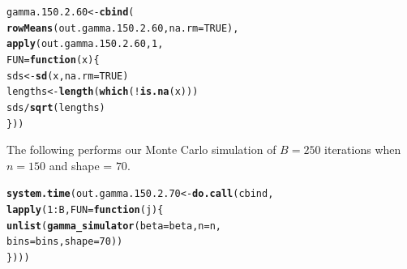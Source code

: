 \documentclass[11pt]{article}\usepackage[]{graphicx}\usepackage[]{color}
\makeatletter
\newcommand{\hlnum}[1]{\textcolor[rgb]{0.686,0.059,0.569}{#1}}%
\newcommand{\hlopt}[1]{\textcolor[rgb]{0,0,0}{#1}}%
\newcommand{\hlstd}[1]{\textcolor[rgb]{0.345,0.345,0.345}{#1}}%
\newcommand{\hlkwa}[1]{\textcolor[rgb]{0.161,0.373,0.58}{\textbf{#1}}}%
\newcommand{\hlkwb}[1]{\textcolor[rgb]{0.69,0.353,0.396}{#1}}%
\newcommand{\hlkwc}[1]{\textcolor[rgb]{0.333,0.667,0.333}{#1}}%
\newcommand{\hlkwd}[1]{\textcolor[rgb]{0.737,0.353,0.396}{\textbf{#1}}}%
\newenvironment{kframe}{%
 \def\at@end@of@kframe{}%
 \ifinner\ifhmode%
  \def\at@end@of@kframe{\end{minipage}}%
  \begin{minipage}{\columnwidth}%
 \fi\fi%
 \def\FrameCommand##1{\hskip\@totalleftmargin \hskip-\fboxsep
 \colorbox{shadecolor}{##1}\hskip-\fboxsep
     \hskip-\linewidth \hskip-\@totalleftmargin \hskip\columnwidth}%
 \MakeFramed {\advance\hsize-\width
   \@totalleftmargin\z@ \linewidth\hsize
   \@setminipage}}%
 {\par\unskip\endMakeFramed%
 \at@end@of@kframe}
\newenvironment{knitrout}{}{} %
\makeatother
\begin{document}
\begin{knitrout}
\color{fgcolor}\begin{kframe}
\begin{alltt}
\hlstd{gamma.150.2.60} \hlkwb{<-} \hlkwd{cbind}\hlstd{(}
  \hlkwd{rowMeans}\hlstd{(out.gamma.150.2.60,} \hlkwc{na.rm} \hlstd{=} \hlnum{TRUE}\hlstd{),}
  \hlkwd{apply}\hlstd{(out.gamma.150.2.60,} \hlnum{1}\hlstd{,}
  \hlkwc{FUN} \hlstd{=} \hlkwa{function}\hlstd{(}\hlkwc{x}\hlstd{)\{}
    \hlstd{sds} \hlkwb{<-} \hlkwd{sd}\hlstd{(x,} \hlkwc{na.rm} \hlstd{=} \hlnum{TRUE}\hlstd{)}
    \hlstd{lengths} \hlkwb{<-} \hlkwd{length}\hlstd{(}\hlkwd{which}\hlstd{(}\hlopt{!}\hlkwd{is.na}\hlstd{(x)))}
    \hlstd{sds} \hlopt{/} \hlkwd{sqrt}\hlstd{(lengths)}
  \hlstd{\}))}
\end{alltt}


{\ttfamily\noindent\bfseries\color{errorcolor}{\#\# Error in is.data.frame(x): object 'out.gamma.150.2.60' not found}}\end{kframe}
\end{knitrout}

The following performs our Monte Carlo simulation of $B = 250$ iterations 
when $n = 150$ and shape = $70$.

\begin{knitrout}
\color{fgcolor}\begin{kframe}
\begin{alltt}
\hlkwd{system.time}\hlstd{(out.gamma.150.2.70} \hlkwb{<-} \hlkwd{do.call}\hlstd{(cbind,}
  \hlkwd{lapply}\hlstd{(}\hlnum{1}\hlopt{:}\hlstd{B,} \hlkwc{FUN} \hlstd{=} \hlkwa{function}\hlstd{(}\hlkwc{j}\hlstd{)\{}
    \hlkwd{unlist}\hlstd{(}\hlkwd{gamma_simulator}\hlstd{(}\hlkwc{beta} \hlstd{= beta,} \hlkwc{n} \hlstd{= n,}
      \hlkwc{bins} \hlstd{= bins,} \hlkwc{shape} \hlstd{=} \hlnum{70}\hlstd{))}
\hlstd{\})))}
\end{alltt}


{\ttfamily\noindent\bfseries\color{errorcolor}{\#\# Error in eval(predvars, data, env): object 'x1' not found}}

{\ttfamily\noindent\itshape\color{messagecolor}{\#\# Timing stopped at: 0.002 0 0.003}}\end{kframe}
\end{knitrout}
\end{document}
